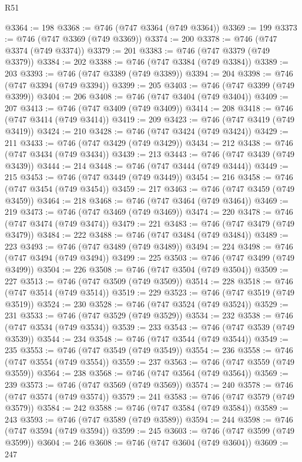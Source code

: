 \begin{lexlean}{R51}
\begin{coremodule}
@3364 := 198
@3368 := @746 (@747 @3364 (@749 @3364))
@3369 := 199
@3373 := @746 (@747 @3369 (@749 @3369))
@3374 := 200
@3378 := @746 (@747 @3374 (@749 @3374))
@3379 := 201
@3383 := @746 (@747 @3379 (@749 @3379))
@3384 := 202
@3388 := @746 (@747 @3384 (@749 @3384))
@3389 := 203
@3393 := @746 (@747 @3389 (@749 @3389))
@3394 := 204
@3398 := @746 (@747 @3394 (@749 @3394))
@3399 := 205
@3403 := @746 (@747 @3399 (@749 @3399))
@3404 := 206
@3408 := @746 (@747 @3404 (@749 @3404))
@3409 := 207
@3413 := @746 (@747 @3409 (@749 @3409))
@3414 := 208
@3418 := @746 (@747 @3414 (@749 @3414))
@3419 := 209
@3423 := @746 (@747 @3419 (@749 @3419))
@3424 := 210
@3428 := @746 (@747 @3424 (@749 @3424))
@3429 := 211
@3433 := @746 (@747 @3429 (@749 @3429))
@3434 := 212
@3438 := @746 (@747 @3434 (@749 @3434))
@3439 := 213
@3443 := @746 (@747 @3439 (@749 @3439))
@3444 := 214
@3448 := @746 (@747 @3444 (@749 @3444))
@3449 := 215
@3453 := @746 (@747 @3449 (@749 @3449))
@3454 := 216
@3458 := @746 (@747 @3454 (@749 @3454))
@3459 := 217
@3463 := @746 (@747 @3459 (@749 @3459))
@3464 := 218
@3468 := @746 (@747 @3464 (@749 @3464))
@3469 := 219
@3473 := @746 (@747 @3469 (@749 @3469))
@3474 := 220
@3478 := @746 (@747 @3474 (@749 @3474))
@3479 := 221
@3483 := @746 (@747 @3479 (@749 @3479))
@3484 := 222
@3488 := @746 (@747 @3484 (@749 @3484))
@3489 := 223
@3493 := @746 (@747 @3489 (@749 @3489))
@3494 := 224
@3498 := @746 (@747 @3494 (@749 @3494))
@3499 := 225
@3503 := @746 (@747 @3499 (@749 @3499))
@3504 := 226
@3508 := @746 (@747 @3504 (@749 @3504))
@3509 := 227
@3513 := @746 (@747 @3509 (@749 @3509))
@3514 := 228
@3518 := @746 (@747 @3514 (@749 @3514))
@3519 := 229
@3523 := @746 (@747 @3519 (@749 @3519))
@3524 := 230
@3528 := @746 (@747 @3524 (@749 @3524))
@3529 := 231
@3533 := @746 (@747 @3529 (@749 @3529))
@3534 := 232
@3538 := @746 (@747 @3534 (@749 @3534))
@3539 := 233
@3543 := @746 (@747 @3539 (@749 @3539))
@3544 := 234
@3548 := @746 (@747 @3544 (@749 @3544))
@3549 := 235
@3553 := @746 (@747 @3549 (@749 @3549))
@3554 := 236
@3558 := @746 (@747 @3554 (@749 @3554))
@3559 := 237
@3563 := @746 (@747 @3559 (@749 @3559))
@3564 := 238
@3568 := @746 (@747 @3564 (@749 @3564))
@3569 := 239
@3573 := @746 (@747 @3569 (@749 @3569))
@3574 := 240
@3578 := @746 (@747 @3574 (@749 @3574))
@3579 := 241
@3583 := @746 (@747 @3579 (@749 @3579))
@3584 := 242
@3588 := @746 (@747 @3584 (@749 @3584))
@3589 := 243
@3593 := @746 (@747 @3589 (@749 @3589))
@3594 := 244
@3598 := @746 (@747 @3594 (@749 @3594))
@3599 := 245
@3603 := @746 (@747 @3599 (@749 @3599))
@3604 := 246
@3608 := @746 (@747 @3604 (@749 @3604))
@3609 := 247

\end{coremodule}
\end{lexlean}
